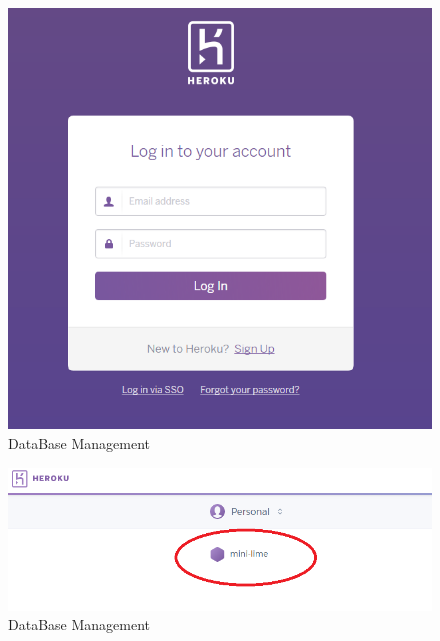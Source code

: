 \documentclass[a4paper,11pt,twoside]{report}
\theoremstyle{definition}
\begin{document}
\begin{figure}[h!]
\begin{center}
\includegraphics[scale = 1]{DB/1}
\end{center}
\caption{DataBase Management}
\end{figure}
\thispagestyle{empty}
\begin{figure}[h!]
\begin{center}
\includegraphics[scale = 1]{DB/2}
\end{center}
\caption{DataBase Management}
\end{figure}
\thispagestyle{empty}
\end{document}

